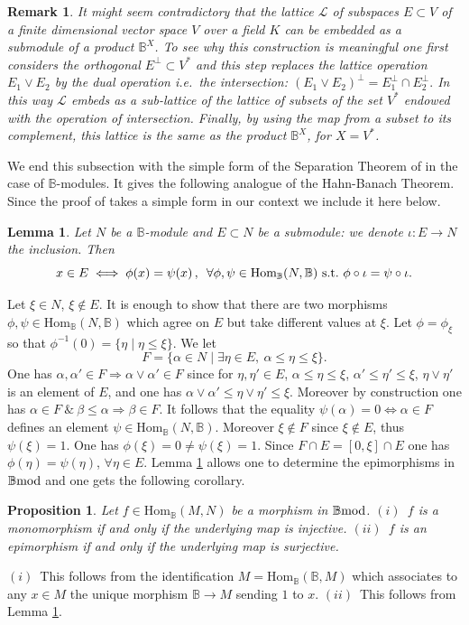 \documentclass[12pt]{article}
\newtheorem{prop}[thm]{Proposition}
\newtheorem{lem}[thm]{Lemma}
\newtheorem{rem}[thm]{Remark}
\def\Hom{{\rm Hom}}
\def\B{{\mathbb B}}
\def\cL{{\mathcal L}}
\def\qqq{\,,\,~\forall}
\newcommand{\ie}{{\it i.e.\/}\ }
\def\Hom {{\mbox{Hom}}}
\def\bmod{{\rm \B mod}}
\begin{document}
\begin{rem}\label{worry} {\rm It might seem contradictory that the lattice $\cL$ of subspaces $E\subset V$ of a finite dimensional vector space $V$ over a field $K$ can be embedded as a submodule of a product $\B^X$. To see why this construction is meaningful one first considers the orthogonal $E^\perp\subset V^*$ and this step replaces the lattice operation $E_1\vee E_2$ by the dual operation \ie the intersection:
$
(E_1\vee E_2)^\perp= E_1^\perp \cap E_2^\perp.
$
In this way $\cL$ embeds as a sub-lattice of the lattice of subsets of the set $V^*$ endowed with the operation of intersection. Finally, by using the map from a subset to its complement, this lattice is the same as the product $\B^X$, for $X=V^*$. 	
}\end{rem}
We end this subsection with the simple form of the Separation Theorem of \cite{Cohen} in the case of $\B$-modules. It gives the following analogue of the Hahn-Banach Theorem. Since the proof of \cite{Cohen}  takes a simple form in our context we include it here below.
\begin{lem} \label{imlem} 
Let $N$ be a $\B$-module and $E\subset N$ be a submodule: we denote $\iota:E\to N$ the inclusion. Then  
\begin{equation}\label{separ}
x\in  E\iff \phi(x)=\psi(x) \qqq  \phi,\psi \in \Hom_\B(N,\B)~{\rm s.t.}~ \phi\circ \iota=\psi \circ \iota.
\end{equation}
\end{lem}
\proof Let $\xi\in N$, $\xi\notin E$. It is enough to show that there are two morphisms $\phi,\psi\in \Hom_\B(N,\B)$ which agree on $E$ but take different values at $\xi$.  Let $\phi=\phi_\xi$ so that $\phi^{-1}(0)=\{\eta\mid \eta\leq \xi\}$. We let 
$$
F=\{\alpha \in N\mid \exists \eta\in E,\ \alpha\leq \eta\leq \xi\}.
$$
One has $\alpha,\alpha'\in F\Rightarrow \alpha\vee \alpha'\in F$ since for $\eta,\eta'\in E$, $\alpha\leq \eta\leq \xi$, $\alpha'\leq \eta'\leq \xi$, $\eta\vee \eta'$ is an element of $E$, and one has  $\alpha\vee \alpha'\leq \eta\vee \eta'\leq \xi$. Moreover by construction one has $\alpha \in F\ \& \ \beta\leq \alpha\Rightarrow \beta\in F$. It follows that the equality $\psi(\alpha)=0\iff \alpha \in F$ defines an element  $\psi\in\Hom_\B(N,\B)$.  Moreover $\xi \notin F$ since $\xi \notin E$, thus $\psi(\xi)=1$.  One has $\phi(\xi)=0\neq \psi(\xi)=1$. Since $F\cap E=[0,\xi]\cap E$ one has $\phi(\eta)=\psi(\eta)$, $\forall \eta \in E$. \endproof
Lemma \ref{imlem} allows one to determine the epimorphisms in $\bmod$ and one gets the following corollary.
\begin{prop}\label{monoepi} Let $f\in \Hom_\B(M,N)$ be a morphism in $\bmod$.\newline
$(i)$~$f$ is a monomorphism if and only if the underlying map is injective.\newline
$(ii)$~$f$ is an epimorphism if and only if the underlying map is surjective.	
\end{prop}
\proof $(i)$~This follows from the identification $M=\Hom_\B(\B,M)$ which associates  to any $x\in M$ the unique morphism $\B\to M$  sending $1$ to $x$.\newline
$(ii)$~This follows from Lemma \ref{imlem}.\endproof 
\end{document}
